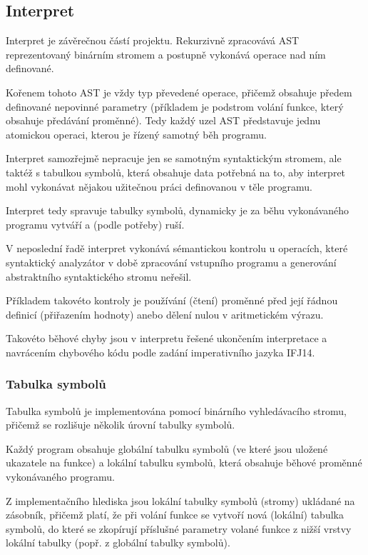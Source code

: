 \documentclass[12pt,a4paper,titlepage,final]{article}
\begin{document}
\subsection{Interpret} \label{interpret}

Interpret je závěrečnou částí projektu. Rekurzivně zpracovává AST reprezentovaný
binárním stromem a postupně vykonává operace nad ním definované.

Kořenem tohoto AST je vždy typ převedené operace, přičemž obsahuje předem
definované nepovinné parametry (příkladem je podstrom volání funkce, který
obsahuje předávání proměnné). Tedy každý uzel AST představuje jednu atomickou
operaci, kterou je řízený samotný běh programu.

Interpret samozřejmě nepracuje jen se samotným syntaktickým stromem, ale
taktéž s tabulkou symbolů, která obsahuje data potřebná na to, aby interpret
mohl vykonávat nějakou užitečnou práci definovanou v těle programu.

Interpret tedy spravuje tabulky symbolů, dynamicky je za běhu
vykonávaného programu vytváří a (podle potřeby) ruší.

V neposlední řadě interpret vykonává sémantickou kontrolu u operacích, které
syntaktický analyzátor v době zpracování vstupního programu a generování
abstraktního syntaktického stromu neřešil.

Příkladem takovéto kontroly je používání (čtení) proměnné před její řádnou
definicí (přiřazením hodnoty) anebo dělení nulou v aritmetickém výrazu.

Takovéto běhové chyby jsou v interpretu řešené ukončením interpretace a navrácením
chybového kódu podle zadání imperativního jazyka IFJ14.

\subsubsection{Tabulka symbolů} \label{tabulka_symbolu}

Tabulka symbolů je implementována pomocí binárního vyhledávacího stromu,
přičemž se rozlišuje několik úrovní tabulky symbolů.

Každý program obsahuje globální tabulku symbolů (ve které jsou uložené ukazatele
na funkce) a lokální tabulku symbolů, která obsahuje běhové proměnné
vykonávaného programu.

Z implementačního hlediska jsou lokální tabulky symbolů (stromy) ukládané na
zásobník, přičemž platí, že při volání funkce se vytvoří nová (lokální)
tabulka symbolů, do které se zkopírují příslušné parametry volané funkce z
nižší vrstvy lokální tabulky (popř. z globální tabulky symbolů).
\end{document}
